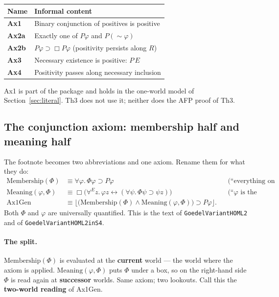 \documentclass[11pt]{article}
\newcommand{\Membership}{\mathrm{Membership}}
\newcommand{\Meaning}{\mathrm{Meaning}}
\begin{document}
\begin{center}
\begin{tabular}{|l|p{}|}
\hline
\textbf{Name} & \textbf{Informal content} \\
\hline
\textbf{Ax1} & Binary conjunction of positives is positive \\
\textbf{Ax2a} & Exactly one of \(P\varphi\) and \(P(\sim\varphi)\) \\
\textbf{Ax2b} & \(P\varphi \supset \Box P\varphi\) (positivity persists along \(R\)) \\
\textbf{Ax3} & Necessary existence is positive: \(P\,E\) \\
\textbf{Ax4} & Positivity passes along necessary inclusion \\
\hline
\end{tabular}
\end{center}

Ax1 is part of the package and holds in the one-world model of Section~\ref{sec:literal}.
Th3 does not use it; neither does the AFP proof of Th3.

\subsection{The conjunction axiom: membership half and meaning half}

The footnote becomes two abbreviations and one axiom. Rename them for what they do:
\begin{align*}
\Membership(\Phi)
&\equiv \forall\varphi.\, \Phi\varphi \supset P\varphi
&&\text{(``everything on the roster is positive'')} \\[0.4em]
\Meaning(\varphi,\Phi)
&\equiv \Box\bigl(\forall^E z.\, \varphi z \leftrightarrow (\forall\psi.\, \Phi\psi \supset \psi z)\bigr)
&&\text{(``\(\varphi\) is the conjunction of the roster'')} \\[0.4em]
\mathrm{Ax1Gen}
&\equiv \bigl\lfloor \bigl(\Membership(\Phi) \land \Meaning(\varphi,\Phi)\bigr) \supset P\varphi \bigr\rfloor.
\end{align*}
Both \(\Phi\) and \(\varphi\) are universally quantified. This is the text of
\texttt{GoedelVariantHOML2} and of \texttt{GoedelVariantHOML2inS4}.

\paragraph{The split.}
\(\Membership(\Phi)\) is evaluated at the \textbf{current} world --- the world where the
axiom is applied. \(\Meaning(\varphi,\Phi)\) puts \(\Phi\) under a box, so on the
right-hand side \(\Phi\) is read again at \textbf{successor} worlds. Same axiom; two
lookouts. Call this the \textbf{two-world reading} of Ax1Gen.
\end{document}
